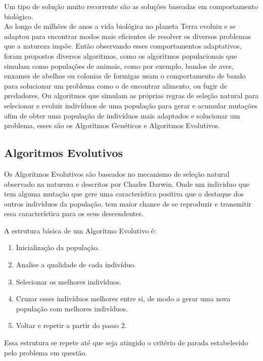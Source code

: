         Um tipo de solução muito recorrente são as soluções baseadas em comportamento biológico. 
        \\
        Ao longo de milhões de anos a vida biológica no planeta Terra evoluiu e se adaptou para encontrar modos mais eficientes de resolver os diversos problemas que a natureza impõe. 
        Então observando esses comportamentos adaptativos, foram propostos diversos algoritmos, 
        como os algoritmos populacionais que simulam como populações de animais, como por exemplo, bandos de aves, enxames de abelhas ou colonias de formigas usam o comportamento de bando para solucionar um problema como o de encontrar alimento, ou fugir de predadores. 
        Ou algoritmos que simulam as próprias regras de seleção natural para selecionar e evoluir indivíduos de uma população para gerar e acumular mutações afim de obter uma população de indivíduos mais adaptados e solucionar um problema, esses são os Algoritmos Genéticos e Algoritmos Evolutivos.


    \subsection{Algoritmos Evolutivos}
        Os Algoritmos Evolutivos são baseados no mecanismo de seleção natural observado na natureza e descritos por Charles Darwin. Onde um individuo que tem alguma mutação que gere uma característica positiva que o destaque dos outros indivíduos da população, tem maior chance de se reproduzir e transmitir essa característica para os seus descendentes.\breakline
        
        \noindent A estrutura básica de um Algoritmo Evolutivo é:
        \begin{enumerate}
            \item Inicialização da população.
            \item Analise a qualidade de cada indivíduo.
            \item Selecionar os melhores indivíduos.
            \item Cruzar esses indivíduos melhores entre si, de modo a gerar uma nova população com melhores indivíduos.
            \item Voltar e repetir a partir do passo 2.
        \end{enumerate}
        
        Essa estrutura se repete até que seja atingido o critério de parada estabelecido pelo problema em questão.\breakline
        
